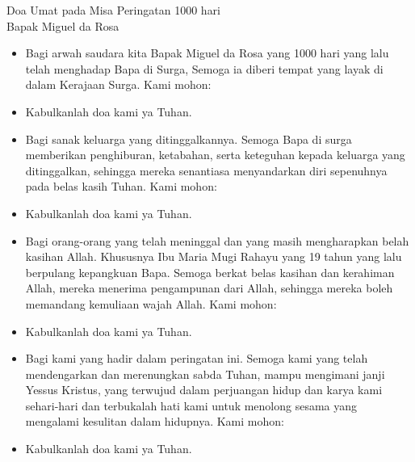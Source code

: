 \documentclass{article}
\newcommand{\BU}[1]{\begin{itemize} \item[U:] #1 \end{itemize}}
\newcommand{\BP}[1]{\begin{itemize} \item[P:] #1 \end{itemize}}
\newcommand{\arwahA}{Bapak Miguel da Rosa }
\newcommand{\hariA}{1000 hari }
\newcommand{\arwahB}{Ibu Maria Mugi Rahayu }
\newcommand{\hariB}{19 tahun }
\begin{document}
\begin{center}\large{Doa Umat pada Misa Peringatan \hariA \\ \arwahA }\end{center}

\BP{Bagi arwah saudara kita \arwahA yang \hariA yang lalu telah menghadap Bapa di Surga,
Semoga ia diberi tempat yang layak di dalam Kerajaan Surga.
 Kami mohon:}

\BU{Kabulkanlah doa kami ya Tuhan.}

\BP{Bagi sanak keluarga yang ditinggalkannya. Semoga Bapa di surga memberikan penghiburan,
ketabahan, serta keteguhan kepada keluarga yang ditinggalkan, sehingga mereka senantiasa 
menyandarkan diri sepenuhnya pada belas kasih Tuhan. Kami mohon:}

\BU{Kabulkanlah doa kami ya Tuhan.}

\BP{Bagi orang-orang yang telah meninggal dan
yang masih mengharapkan belah kasihan Allah. Khususnya \arwahB yang \hariB yang lalu berpulang kepangkuan Bapa.
Semoga berkat belas kasihan dan kerahiman
Allah, mereka menerima pengampunan dari Allah, sehingga mereka boleh memandang kemuliaan wajah Allah. Kami mohon:}

\BU{Kabulkanlah doa kami ya Tuhan.}

\BP{Bagi kami yang hadir dalam peringatan ini.
Semoga kami yang telah mendengarkan dan merenungkan sabda Tuhan, mampu mengimani
janji Yessus Kristus, yang terwujud dalam perjuangan hidup dan karya kami sehari-hari dan terbukalah hati kami untuk menolong sesama yang mengalami kesulitan dalam hidupnya.
Kami mohon:}

\BU{Kabulkanlah doa kami ya Tuhan.}
\end{document}
